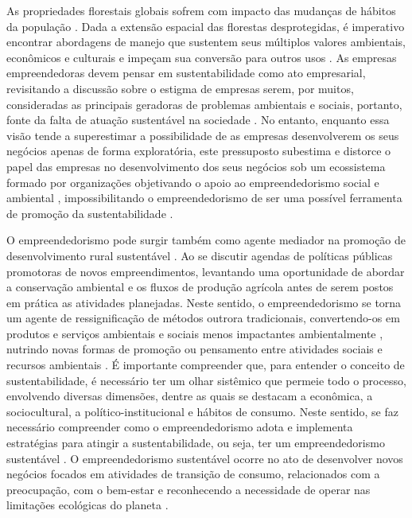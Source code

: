 As propriedades florestais globais sofrem com impacto das mudanças de hábitos da população \cite{Singh2021ForestIntervention}. Dada a extensão espacial das florestas desprotegidas, é imperativo encontrar abordagens de manejo que sustentem seus múltiplos valores ambientais, econômicos e culturais e impeçam sua conversão para outros usos \cite{Lindenmayer2012AIssues}. As empresas empreendedoras devem pensar em sustentabilidade como ato empresarial, revisitando a discussão sobre o estigma de empresas serem, por muitos, consideradas as principais geradoras de problemas ambientais e sociais, portanto, fonte da falta de atuação sustentável na sociedade \cite{Schaltegger2022ManagingField}. No entanto, enquanto essa visão tende a superestimar a possibilidade de as empresas desenvolverem os seus negócios apenas de forma exploratória, este pressuposto subestima e distorce o papel das empresas no desenvolvimento dos seus negócios sob um ecossistema formado por organizações objetivando o apoio ao empreendedorismo social e ambiental \cite{Gu2022TheCountries}, impossibilitando o empreendedorismo de ser uma possível ferramenta de promoção da sustentabilidade \cite{Breitbarth2018TheSpace}.

O empreendedorismo pode surgir também como agente mediador na promoção de desenvolvimento rural sustentável \cite{Luswaga2021Non-timberTanzania}. Ao se discutir agendas de políticas públicas promotoras de novos empreendimentos, levantando uma oportunidade de abordar a conservação ambiental e os fluxos de produção agrícola antes de serem postos em prática as atividades planejadas. Neste sentido, o empreendedorismo se torna um agente de ressignificação de métodos outrora tradicionais, convertendo-os em produtos e serviços ambientais e sociais menos impactantes ambientalmente \cite{Schaltegger2022ManagingField}, nutrindo novas formas de promoção ou pensamento entre atividades sociais e recursos ambientais \cite{Kanda2021FromEcosystems}. É importante compreender que, para entender o conceito de sustentabilidade, é necessário ter um olhar sistêmico que permeie todo o processo, envolvendo diversas dimensões, dentre as quais se destacam a econômica, a sociocultural, a político-institucional e hábitos de consumo. Neste sentido, se faz necessário compreender como o empreendedorismo adota e implementa estratégias para atingir a sustentabilidade, ou seja, ter um empreendedorismo sustentável \cite{Jarrar2022EntrepreneurshipSESOs}. O empreendedorismo sustentável ocorre no ato de desenvolver novos negócios focados em atividades de transição de consumo, relacionados com a preocupação, com o bem-estar e reconhecendo a necessidade de operar nas limitações ecológicas do planeta \cite{Munoz2018SustainableAhead}.

